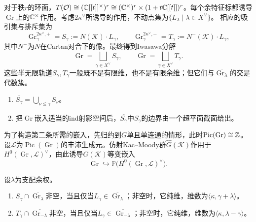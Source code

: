 对于秩$r$的环面，$T(\mathcal O)\cong(\mathbb{C}[[t]]^\times)^r\cong(\mathbb{C}^\times)^r\times(1+t\mathbb{C}[[t]])^r$。每个余特征标都诱导$\operatorname{Gr}$上的$\mathbb{C}^\times$作用。考虑$2\kappa^\vee$所诱导的作用，不动点集为$\{L_\lambda\mid\lambda\in X^\vee\}$。%
相应的吸引集与排斥集为
\[\operatorname{Gr}^{2\kappa^\vee,+}_\gamma=S_\gamma:=N(\mathcal K)\cdot L_\gamma,\qquad\operatorname{Gr}^{2\kappa^\vee,-}_\gamma=T_\gamma:=N^-(\mathcal K)\cdot L_\gamma,\]
其中$N^-$为$N$在Cartan对合下的像。最终得到Iwasawa分解
\[\operatorname{Gr}=\bigsqcup_{\gamma\in X^\vee}S_\gamma,\qquad\operatorname{Gr}=\bigsqcup_{\gamma\in X^\vee}T_\gamma.\]
这些半无限轨道$S_\gamma,T_\gamma$一般既不是有限维，也不是有限余维；但它们与$\overline{\operatorname{Gr}_\lambda}$的交是代数簇。
\begin{proposition}\label{L21S2O4}
\begin{enumerate}[label=(\arabic*)]
\item $\overline{S_\gamma}=\bigcup_{\nu\le\gamma}S_\nu$。
\item 把$\operatorname{Gr}$嵌入适当的ind射影空间后，$\overline{S_\gamma}$中$S_\gamma$的边界由一个超平面截面给出。
\end{enumerate}
\end{proposition}
为了构造第二条所需的嵌入，先归约到$G$单且单连通的情形，此时$\operatorname{Pic}(\operatorname{Gr})\cong\mathbb{Z}$。
设$\mathcal L$为$\operatorname{Pic}(\operatorname{Gr})$的丰沛生成元。仿射Kac–Moody群$\widehat G(\mathcal K)$作用于$H^0(\operatorname{Gr},\mathcal L)^\vee$，由此诱导$G(\mathcal K)$等变嵌入
\[\operatorname{Gr}\hookrightarrow\mathbb P\bigl(H^0(\operatorname{Gr},\mathcal L)^\vee\bigr).\]
\begin{theorem}\label{L21S2O5}
设$\lambda$为支配余权。
\begin{enumerate}[label=(\arabic*)]
\item $S_\gamma\cap\overline{\operatorname{Gr}_\lambda}$非空，当且仅当$L_\gamma\in\overline{\operatorname{Gr}_\lambda}$；非空时，它纯维，维数为$\langle\kappa,\gamma+\lambda\rangle$。
\item $T_\gamma\cap\overline{\operatorname{Gr}_{-\lambda}}$非空，当且仅当$L_\gamma\in\overline{\operatorname{Gr}_{-\lambda}}$；非空时，它纯维，维数为$\langle\kappa,\lambda-\gamma\rangle$。
\end{enumerate}
\end{theorem}
